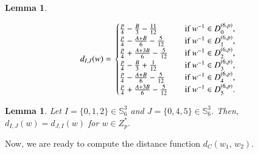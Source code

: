 \documentclass[letter]{ieice}
\newtheorem{sec3_lemma5}[sec3_lemma1]{Lemma}
\newtheorem{sec3_lemma6}[sec3_lemma1]{Lemma}
\begin{document}
\begin{sec3_lemma5}
\begin{itemize}
\begin{equation*}
d_{I,J}(w)=\\                  
\begin{cases}
\frac{p}{4}-\frac{B}{3}-\frac{11}{12}&\quad \mbox{if}\ w^{-1} \in  D_{0}^{(6,p)},\\
\frac{p}{4}-\frac{A+B}{6}-\frac{5}{12}&\quad \mbox{if}\ w^{-1} \in  D_{1}^{(6,p)},\\
\frac{p}{4}+\frac{A+3B}{6}-\frac{5}{12}&\quad \mbox{if}\ w^{-1} \in  D_{2}^{(6,p)},\\
\frac{p}{4}-\frac{B}{3}+\frac{1}{12}&\quad \mbox{if}\ w^{-1} \in  D_{3}^{(6,p)},\\
\frac{p}{4}-\frac{A+B}{6}-\frac{5}{12}&\quad \mbox{if}\ w^{-1} \in  D_{4}^{(6,p)},\\
\frac{p}{4}+\frac{A+3B}{6}-\frac{5}{12}&\quad \mbox{if}\ w^{-1} \in  D_{5}^{(6,p)}.
\end{cases}
\end{equation*}
\end{itemize}
\end{sec3_lemma5}
\begin{sec3_lemma6}\label{sec3-lemma6}
Let $ I=\lbrace0,1,2\rbrace \in  \mathbb{S}_{6}^{3}$ and $ J=\lbrace0,4,5\rbrace \in  \mathbb{S}_{6}^{3}$. Then, $ d_{I,J}(w)=d_{J,I}(w) $ for $ w\in Z_{p}^{*} $.
\end{sec3_lemma6}   

Now, we are ready to compute the distance function $ d_{\mathit{C}}(w_{1},\,w_{2}) $.
\end{document}
